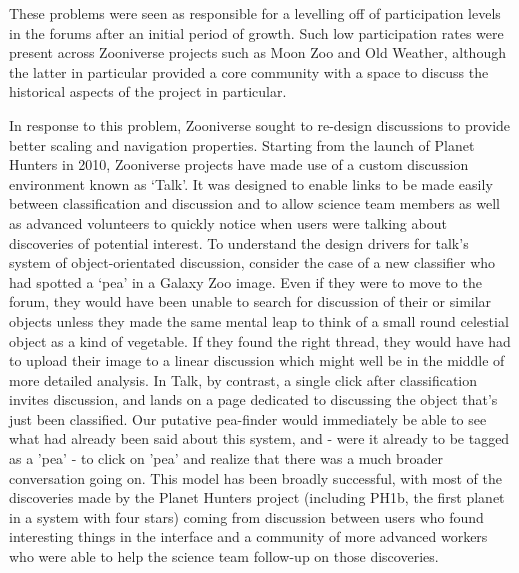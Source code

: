 \documentclass{sigchi}
\begin{document}
These problems were seen as responsible for a levelling off of participation levels in the forums after an initial period of growth. Such low participation rates were present across Zooniverse projects such as Moon Zoo and Old Weather, although the latter in particular provided a core community with a space to discuss the historical aspects of the project in particular.


In response to this problem, Zooniverse sought to re-design discussions to provide better scaling and navigation properties.  Starting from the launch of Planet Hunters in 2010, Zooniverse projects have made use of a custom discussion environment known as `Talk'. It was designed to enable links to be made easily between classification and discussion and to allow science team members as well as advanced volunteers to quickly notice when users were talking about discoveries of potential interest. To understand the design drivers for talk's system of object-orientated discussion, consider the case of a new classifier who had spotted a `pea' in a Galaxy Zoo image. Even if they were to move to the forum, they would have been unable to search for discussion of their or similar objects unless they made the same mental leap to think of a small round celestial object as a kind of vegetable. If they found the right thread, they would have had to upload their image to a linear discussion which might well be in the middle of more detailed analysis. In Talk, by contrast, a single click after classification invites discussion, and lands on a page dedicated to discussing the object that's just been classified. Our putative pea-finder would immediately be able to see what had already been said about this system, and - were it already to be tagged as a 'pea' - to click on 'pea' and realize that there was a much broader conversation going on. This model has been broadly successful, with most of the discoveries made by the Planet Hunters project (including PH1b, the first planet in a system with four stars) coming from discussion between users who found interesting things in the interface and a community of more advanced workers who were able to help the science team follow-up on those discoveries. 
\end{document}
